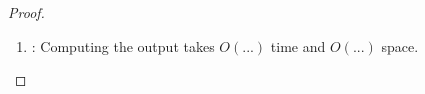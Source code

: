 \begin{proof}
\begin{enumerate}
		
		
		
		
		
		
		
		
		\item \TODO:
		Computing the output takes $O(...)$ time %
		and $O(...)$ space. %
	\end{enumerate}
	
%	
%	
	
%	
%	
%	
%	
%	
\end{proof}
